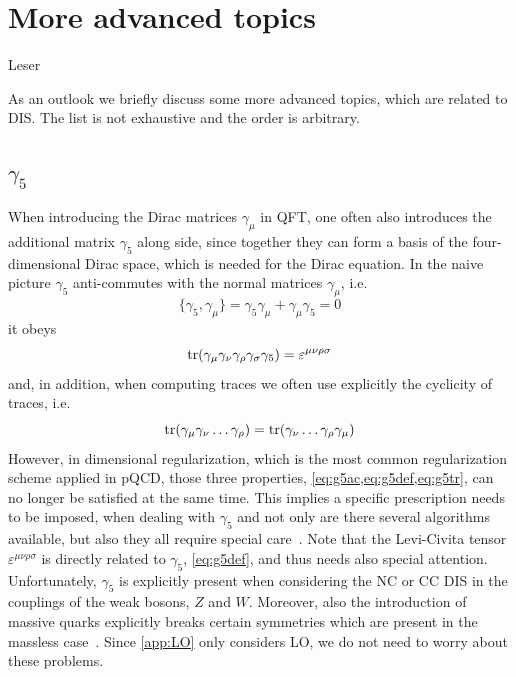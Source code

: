 \chapter{More advanced topics}
\label{chap:outlook}

%
{Leser}

As an outlook we briefly discuss some more advanced topics, which are related to DIS.
The list is not exhaustive and the order is arbitrary.

\section[gamma5]{$\gamma_5$}
\label{sec:g5}
When introducing the Dirac matrices $\gamma_\mu$ in QFT, one often also introduces the additional matrix $\gamma_5$ along side, since together they can form a basis of the four-dimensional Dirac space, which is needed for the Dirac equation.
In the naive picture $\gamma_5$ anti-commutes with the normal matrices $\gamma_\mu$, i.e.\
\begin{equation}
    \{\gamma_5,\gamma_\mu\} = \gamma_5 \gamma_\mu + \gamma_\mu \gamma_5 = 0 \label{eq:g5ac}
\end{equation}
it obeys
\begin{equation}
    \tr(\gamma_\mu\gamma_\nu\gamma_\rho\gamma_\sigma\gamma_5) = \varepsilon^{\mu\nu\rho\sigma} \label{eq:g5def}
\end{equation}
and, in addition, when computing traces we often use explicitly the cyclicity of traces, i.e.\
\begin{equation}
    \tr(\gamma_\mu \gamma_\nu \ldots \gamma_\rho) = \tr(\gamma_\nu \ldots \gamma_\rho \gamma_\mu) \label{eq:g5tr}
\end{equation}
However, in dimensional regularization, which is the most common regularization scheme applied in pQCD, those three properties, \cref{eq:g5ac,eq:g5def,eq:g5tr}, can no longer be satisfied at the same time.
This implies a specific prescription needs to be imposed, when dealing with $\gamma_5$ and not only are there several algorithms available, but also they all require special care~\cite{Gnendiger:2017pys}.
Note that the Levi-Civita tensor $\varepsilon^{\mu\nu\rho\sigma}$ is directly related to $\gamma_5$, \cref{eq:g5def}, and thus needs also special attention.
Unfortunately, $\gamma_5$ is explicitly present when considering the NC or CC DIS in the couplings of the weak bosons, $Z$ and $W$.
Moreover, also the introduction of massive quarks explicitly breaks certain symmetries which are present in the massless case~\cite{Hekhorn:2019nlf}.
Since \cref{app:LO} only considers LO, we do not need to worry about these problems.

